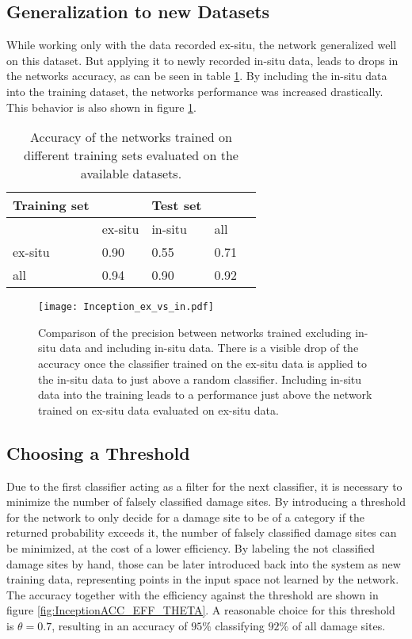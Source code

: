 \subsection{Generalization to new Datasets}
While working only with the data recorded ex-situ, the network generalized well on this dataset. But applying it to newly recorded in-situ data, leads to drops in the networks accuracy, as can be seen in table \ref{tab:AccuracyComparisonInception}. By including the in-situ data into the training dataset, the networks performance was increased drastically. This behavior is also shown in figure \ref{fig:Inception_ex_vs_in}.

\begin{table}[H]
 \begin{center}
  \begin{tabular}{@{} *5l @{}} \toprule[2pt]
   Training set &  &Test set&  \\\midrule
    & ex-situ  & in-situ  & all   \\ 
   ex-situ  & 0.90 & 0.55 & 0.71\\ 
   all  & 0.94 & 0.90 & 0.92\\\bottomrule[2pt]

  \end{tabular}
 \end{center}
 \caption{Accuracy of the networks trained on different training sets evaluated on the available datasets.}
 \label{tab:AccuracyComparisonInception}
\end{table}

\begin{figure}
  \texttt{[image: Inception\_ex\_vs\_in.pdf]}
\caption{Comparison of the precision between networks trained excluding in-situ data and including in-situ data. There is a visible drop of the accuracy once the classifier trained on the ex-situ data is applied to the in-situ data to just above a random classifier. Including in-situ data into the training leads to a performance just above the network trained on ex-situ data evaluated on ex-situ data.}
\label{fig:Inception_ex_vs_in}
\end{figure}

\subsection{Choosing a Threshold}

Due to the first classifier acting as a filter for the next classifier, it is necessary to minimize the number of falsely classified damage sites. By introducing a threshold for the network to only decide for a damage site to be of a category if the returned probability exceeds it, the number of falsely classified damage sites can be minimized, at the cost of a lower efficiency. By labeling the not classified damage sites by hand, those can be later introduced back into the system as new training data, representing points in the input space not learned by the network. The accuracy together with the efficiency against the threshold are shown in figure \ref{fig:InceptionACC_EFF_THETA}. A reasonable choice for this threshold is $\theta=0.7$, resulting in an accuracy of $95\%$ classifying $92\%$ of all damage sites. 


